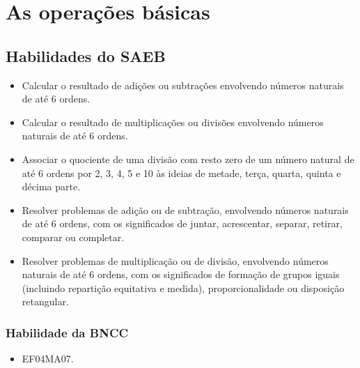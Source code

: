 \chapter{As operações básicas}

\section*{Habilidades do SAEB}

\begin{itemize}
\item Calcular o resultado de adições ou subtrações envolvendo números
naturais de até 6 ordens.
\item Calcular o resultado de multiplicações ou divisões envolvendo números
naturais de até 6 ordens.
\item Associar o quociente de uma divisão com resto zero de um número
natural de até 6 ordens por 2, 3, 4, 5 e 10 às ideias de metade, terça,
quarta, quinta e décima parte.
\item Resolver problemas de adição ou de subtração, envolvendo números
naturais de até 6 ordens, com os significados de juntar, acrescentar,
separar, retirar, comparar ou completar.
\item Resolver problemas de multiplicação ou de divisão, envolvendo números
naturais de até 6 ordens, com os significados de formação de grupos
iguais (incluindo repartição equitativa e medida), proporcionalidade ou
disposição retangular.
\end{itemize}

\subsection{Habilidade da BNCC}

\begin{itemize}
\item EF04MA07.
\end{itemize}

